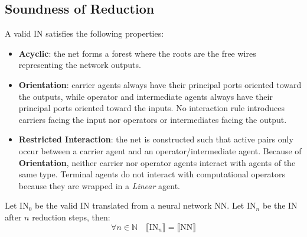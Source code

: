 \subsection{Soundness of Reduction}
\label{sec:soundness-of-reduction}

\begin{property}
	A valid IN satisfies the following properties:
	\begin{itemize}
		\item \textbf{Acyclic}: the net forms a forest where the roots are the free wires representing
			the network outputs.
		\item \textbf{Orientation}: carrier agents always have their principal ports oriented toward the outputs,
			while operator and intermediate agents always have their principal ports oriented toward the
			inputs. No interaction rule introduces carriers facing the input nor operators or
			intermediates facing the output.
		\item \textbf{Restricted Interaction}: the net is constructed such that active pairs only occur between a
			carrier agent and an operator/intermediate agent. Because of \textbf{Orientation}, neither
			carrier nor operator agents interact with agents of the same type. Terminal agents do not
			interact with computational operators because they are wrapped in a \textit{Linear} agent.
	\end{itemize}
\end{property}

\begin{theorem}
	Let $\text{IN}_0$ be the valid IN translated from a neural network $\text{NN}$. Let $\text{IN}_n$ be
	the IN after $n$ reduction steps, then:
	\begin{equation}
	\forall n \in \mathbb{N} \quad \llbracket \text{IN}_n \rrbracket = \llbracket \text{NN} \rrbracket
	\end{equation}
\end{theorem}

